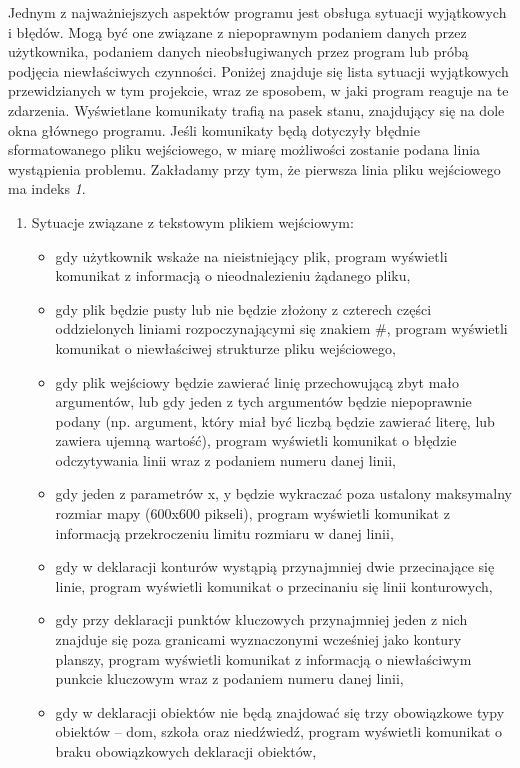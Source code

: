 \documentclass[a4paper,12pt]{article}
\newcommand\tab[1][0.6cm]{\hspace*{#1} }
\begin{document}
\tab Jednym z najważniejszych aspektów programu jest obsługa sytuacji wyjątkowych i błędów. Mogą być one związane z niepoprawnym podaniem danych przez użytkownika, podaniem danych nieobsługiwanych przez program lub próbą podjęcia niewłaściwych czynności. Poniżej znajduje się lista sytuacji wyjątkowych przewidzianych w tym projekcie, wraz ze sposobem, w jaki program reaguje na te zdarzenia. Wyświetlane komunikaty trafią na pasek stanu, znajdujący się na dole okna głównego programu. Jeśli komunikaty będą dotyczyły błędnie sformatowanego pliku wejściowego, w miarę możliwości zostanie podana linia wystąpienia problemu. Zakładamy przy tym, że pierwsza linia pliku wejściowego ma indeks \textit{1}.

\begin{enumerate}

\item Sytuacje związane z tekstowym plikiem wejściowym:
\begin{itemize}
\item gdy użytkownik wskaże na nieistniejący plik, program wyświetli komunikat z informacją o nieodnalezieniu żądanego pliku,
\item gdy plik będzie pusty lub nie będzie złożony z czterech części oddzielonych liniami rozpoczynającymi się znakiem \#, program wyświetli komunikat o niewłaściwej strukturze pliku wejściowego,
\item gdy plik wejściowy będzie zawierać linię przechowującą zbyt mało argumentów, lub gdy jeden z tych argumentów będzie niepoprawnie podany (np. argument, który miał być liczbą będzie zawierać literę, lub zawiera ujemną wartość), program wyświetli komunikat o błędzie odczytywania linii wraz z podaniem numeru danej linii,
\item gdy jeden z parametrów x, y będzie wykraczać poza ustalony maksymalny rozmiar mapy (600x600 pikseli), program wyświetli komunikat z informacją przekroczeniu limitu rozmiaru w danej linii,
\item gdy w deklaracji konturów wystąpią przynajmniej dwie przecinające się linie, program wyświetli komunikat o przecinaniu się linii konturowych,
\item gdy przy deklaracji punktów kluczowych przynajmniej jeden z nich znajduje się poza granicami wyznaczonymi wcześniej jako kontury planszy, program wyświetli komunikat z informacją o niewłaściwym punkcie kluczowym wraz z podaniem numeru danej linii,
\item gdy w deklaracji obiektów nie będą znajdować się trzy obowiązkowe typy obiektów -- dom, szkoła oraz niedźwiedź, program wyświetli komunikat o braku obowiązkowych deklaracji obiektów,

\end{itemize}
\end{enumerate}
\end{document}
